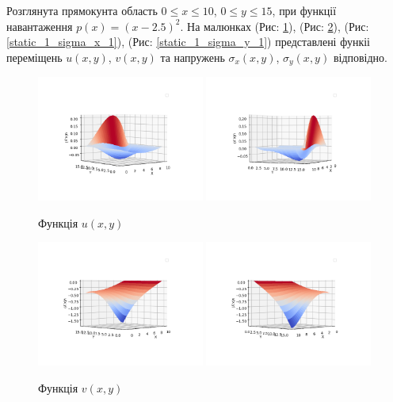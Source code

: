 Розглянута прямокунта область $0 \le x \le 10$, $0 \le y \le 15$, при функції навантаження $p(x)=(x-2.5)^2$.
На малюнках (Рис: \ref{static_1_u_1}), (Рис: \ref{static_1_v_1}), (Рис: \ref{static_1_sigma_x_1}), (Рис: \ref{static_1_sigma_y_1})
представлені функіі переміщень $u(x,y)$, $v(x,y)$ та напружень $\sigma_x(x,y)$, $\sigma_y(x,y)$ відповідно.
\begin{figure}[h!]
    \begin{center}
        \includegraphics[width=0.49\textwidth, scale=1]{images/results/static_1/function_u_1.png}
        \includegraphics[width=0.49\textwidth, scale=1]{images/results/static_1/function_u_2.png}
        \caption{Функція $u(x, y)$}\label{static_1_u_1}
    \end{center}
\end{figure}
\newpage
\begin{figure}[h!]
    \begin{center}
        \includegraphics[width=0.49\textwidth, scale=1]{images/results/static_1/function_v_1.png}
        \includegraphics[width=0.49\textwidth, scale=1]{images/results/static_1/function_v_2.png}
        \caption{Функція $v(x, y)$}\label{static_1_v_1}
    \end{center}
\end{figure}
